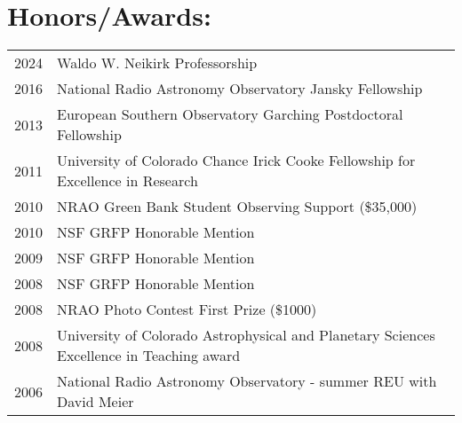 \clearpage
\setlength{\extrarowheight}{0pt}
\section*{Honors/Awards: }
\begin{tabular}{ll}
     2024 & Waldo W. Neikirk Professorship \\
     2016 & National Radio Astronomy Observatory Jansky Fellowship \\
     2013 & European Southern Observatory Garching Postdoctoral Fellowship \\
     2011 & University of Colorado Chance Irick Cooke Fellowship for Excellence in Research \\
     2010 & NRAO Green Bank Student Observing Support (\$35,000) \\
     2010 & NSF GRFP Honorable Mention \\
     2009 & NSF GRFP Honorable Mention \\
     2008 & NSF GRFP Honorable Mention \\
     2008 & NRAO Photo Contest First Prize (\$1000)\\
     2008 & University of Colorado Astrophysical and Planetary Sciences Excellence in Teaching award  \\
     2006 & National Radio Astronomy Observatory - summer REU with David Meier  \\
\end{tabular}

